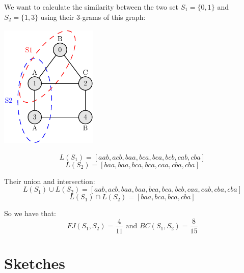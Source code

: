\begin{esempio}
	We want to calculate the similarity between the two set $S_{1} = \{0,1\}$ and $S_{2} = \{1, 3\}$ using their $3$-grams of this graph:
		
	
	\begin{minipage}[t]{1\textwidth}
	\centering
	\includegraphics[width=4.6cm,height=6cm]{figure/figure-2-1}
	\end{minipage}\hfill

	\begin{equation*}
		L(S_{1}) = [aab, acb, baa, bca, bca, bcb, cab, cba]
	\end{equation*}
	\begin{equation*}
		L(S_{2}) = [baa, baa, bca, bca, caa, cba, cba]
	\end{equation*}
	
	Their union and intersection:
	\begin{equation*}
	L(S_{1}) \cup L(S_{2}) = [aab, acb, baa, baa, bca, bca, bcb, caa, cab, cba, cba]
	\end{equation*}
	\begin{equation*}
	L(S_{1}) \cap L(S_{2}) = [baa, bca, bca, cba]
	\end{equation*}
		
	So we have that:
	\begin{equation*}
		FJ(S_{1}, S_{2}) = \frac{4}{11} \text{  and  } BC(S_{1}, S_{2}) = \frac{8}{15}
	\end{equation*}
	
\end{esempio}


\section{Sketches}

